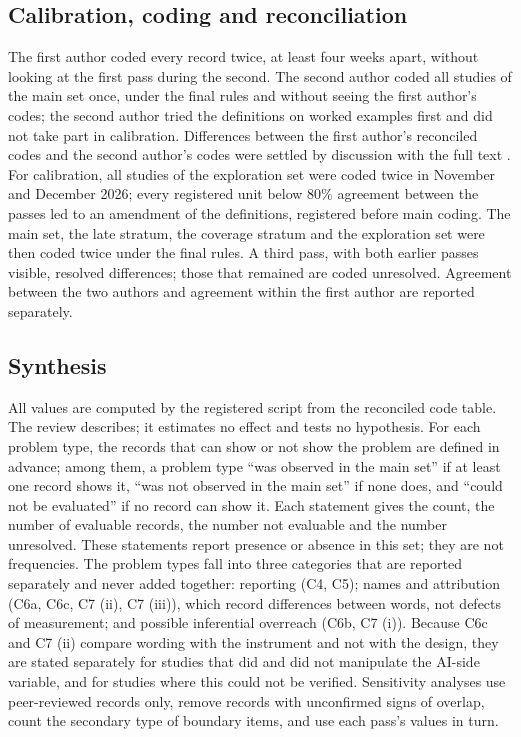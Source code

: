 \documentclass[11pt]{article}
\begin{document}
\subsection{Calibration, coding and reconciliation}
The first author coded every record twice, at least four weeks apart, without looking at the first pass during the
second. The second author coded all studies of the main set once, under the final rules and without seeing the first
author's codes; the second author tried the definitions on worked examples first and did not take part in calibration.
Differences between the first author's reconciled codes and the second author's codes were settled by discussion with
the full text \citep{shea2017}. For calibration, all studies of the exploration set were coded twice in November and December 2026;
every registered unit below 80\% agreement between the passes led to an amendment of the definitions, registered
before main coding. The main set, the late stratum, the coverage stratum and the exploration set were then coded twice under the final
rules. A third pass, with both earlier passes visible, resolved differences; those that remained are coded
unresolved. Agreement between the two authors and agreement within the first author are reported separately.

\subsection{Synthesis}
All values are computed by the registered script from the reconciled code table. The review describes; it estimates no
effect and tests no hypothesis. For each problem type, the records that can show or not show the problem are defined in
advance; among them, a problem type ``was observed in the main set'' if at least one record shows it, ``was not observed
in the main set'' if none does, and ``could not be evaluated'' if no record can show it. Each statement gives the count,
the number of evaluable records, the number not evaluable and the number unresolved. These statements report presence
or absence in this set; they are not frequencies. The problem types fall into three categories that are reported
separately and never added together: reporting (C4, C5); names and attribution (C6a, C6c, C7 (ii), C7 (iii)), which
record differences between words, not defects of measurement; and possible inferential overreach (C6b, C7 (i)).
Because C6c and C7 (ii) compare wording with the instrument and not with the design, they are stated separately for
studies that did and did not manipulate the AI-side variable, and for studies where this could not be verified. Sensitivity analyses use peer-reviewed records only, remove records
with unconfirmed signs of overlap, count the secondary type of boundary items, and use each pass's values in turn.
\end{document}
